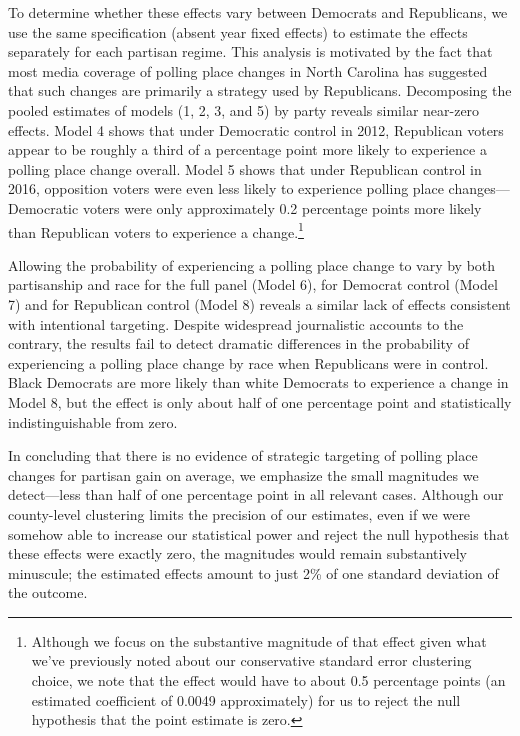 \documentclass[12pt]{article}
\begin{document}
To determine whether these effects vary between Democrats and Republicans, we use the same specification (absent year fixed effects) to estimate the effects separately for each partisan regime. This analysis is motivated by the fact that most media coverage of polling place changes in North Carolina has suggested that such changes are primarily a strategy used by Republicans. Decomposing the pooled estimates of models (1, 2, 3, and 5) by party reveals similar near-zero effects.  Model 4 shows that under Democratic control in 2012, Republican voters appear to be roughly a third of a percentage point more likely to experience a polling place change overall. Model 5 shows that under Republican control in 2016, opposition voters were even less likely to experience polling place changes---Democratic voters were only approximately 0.2 percentage points more likely than Republican voters to experience a change.\footnote{Although we focus on the substantive magnitude of that effect given what we've previously noted about our conservative standard error clustering choice, we note that the effect would have to about 0.5 percentage points (an estimated coefficient of 0.0049 approximately) for us to reject the null hypothesis that the point estimate is zero.}

Allowing the probability of experiencing a polling place change to vary by both partisanship and race for the full panel (Model 6), for Democrat control (Model 7) and for Republican control (Model 8) reveals a similar lack of effects consistent with intentional targeting. Despite widespread journalistic accounts to the contrary, the results fail to detect dramatic differences in the probability of experiencing a polling place change by race when Republicans were in control.  Black Democrats are more likely than white Democrats to experience a change in Model 8, but the effect is only about half of one percentage point and statistically indistinguishable from zero.

In concluding that there is no evidence of strategic targeting of polling place changes for partisan gain on average, we emphasize the small magnitudes we detect---less than half of one percentage point in all relevant cases.  Although our county-level clustering limits the precision of our estimates, even if we were somehow able to increase our statistical power and reject the null hypothesis that these effects were exactly zero, the magnitudes would remain substantively minuscule; the estimated effects amount to just 2\% of one standard deviation of the outcome.
\end{document}
